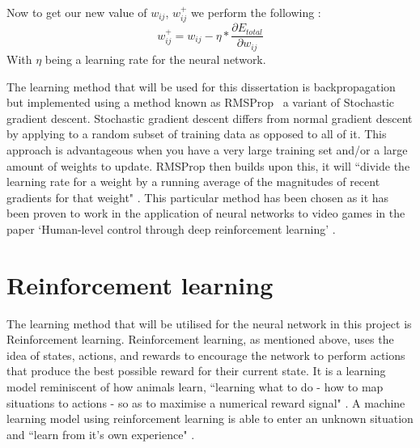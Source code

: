 \documentclass[10pt]{article}
\begin{document}
		Now to get our new value of $w_{ij}$, $w^+_{ij}$ we perform the following \cite{bpexample}:
		\begin{equation}
			w^+_{ij} = w_{ij} - \eta * \frac{\partial E_{total}}{\partial w_{ij}}
		\end{equation}
		With $\eta$ being a learning rate for the neural network.\\
		
		\medskip

		The learning method that will be used for this dissertation is backpropagation but implemented using a method known as RMSProp \cite{rms}\ a variant of Stochastic gradient descent. Stochastic gradient descent differs from normal gradient descent by applying to a random subset of training data as opposed to all of it. This approach is advantageous when you have a very large training set and/or a large amount of weights to update. RMSProp then builds upon this, it will ``divide the learning rate for a weight by a running average of the magnitudes of recent gradients for that weight" \cite{rms}. This particular method has been chosen as it has been proven to work in the application of neural networks to video games in the paper `Human-level control through deep reinforcement learning' \cite{humanlevel}.\\
	
	\bigskip
	\section{Reinforcement learning}
		The learning method that will be utilised for the neural network in this project is Reinforcement learning. Reinforcement learning, as mentioned above, uses the idea of states, actions, and rewards to encourage the network to perform actions that produce the best possible reward for their current state. It is a learning model reminiscent of how animals learn, ``learning what to do - how to map situations to actions - so as to maximise a numerical reward signal" \cite{rlintro}. A machine learning model using reinforcement learning is able to enter an unknown situation and ``learn from it's own experience" \cite{rlintro}.\\
		
\end{document}
